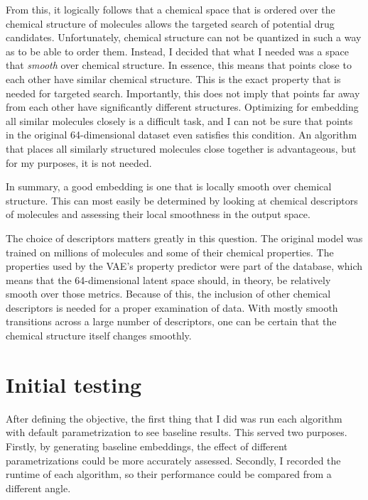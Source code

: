 From this, it logically follows that a chemical space that is ordered over the chemical structure of molecules allows the targeted search of potential drug candidates. Unfortunately, chemical structure can not be quantized in such a way as to be able to order them. Instead, I decided that what I needed was a space that \textit{smooth} over chemical structure. In essence, this means that points close to each other have similar chemical structure. This is the exact property that is needed for targeted search. Importantly, this does not imply that points far away from each other have significantly different structures. Optimizing for embedding all similar molecules closely is a difficult task, and I can not be sure that points in the original 64-dimensional dataset even satisfies this condition. An algorithm that places all similarly structured molecules close together is advantageous, but for my purposes, it is not needed.

In summary, a good embedding is one that is locally smooth over chemical structure. This can most easily be determined by looking at chemical descriptors of molecules and assessing their local smoothness in the output space.

The choice of descriptors matters greatly in this question. The original model was trained on millions of molecules and some of their chemical properties. The properties used by the VAE's property predictor were part of the database, which means that the 64-dimensional latent space should, in theory, be relatively smooth over those metrics. Because of this, the inclusion of other chemical descriptors is needed for a proper examination of data. With mostly smooth transitions across a large number of descriptors, one can be certain that the chemical structure itself changes smoothly.

\section{Initial testing}\label{sec:initial-testing}

After defining the objective, the first thing that I did was run each algorithm with default parametrization to see baseline results. This served two purposes. Firstly, by generating baseline embeddings, the effect of different parametrizations could be more accurately assessed. Secondly, I recorded the runtime of each algorithm, so their performance could be compared from a different angle.

